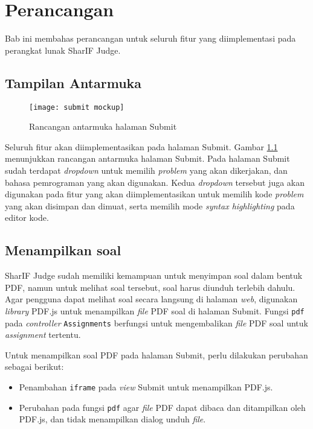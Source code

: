 \chapter{Perancangan}
\label{chap:perancangan}

Bab ini membahas perancangan untuk seluruh fitur yang diimplementasi pada  perangkat lunak SharIF Judge.

\section{Tampilan Antarmuka}
\label{sec:4:antarmuka}

\begin{figure}[H]
	\centering  
	\texttt{[image: submit mockup]}  
	\caption{Rancangan antarmuka halaman Submit} 
	\label{fig:4:antarmuka} 
\end{figure} 

Seluruh fitur akan diimplementasikan pada halaman Submit. Gambar \ref{fig:4:antarmuka} menunjukkan rancangan antarmuka halaman Submit. Pada halaman Submit sudah terdapat \textit{dropdown} untuk memilih \textit{problem} yang akan dikerjakan, dan bahasa pemrograman yang akan digunakan. Kedua \textit{dropdown} tersebut juga akan digunakan pada fitur yang akan diimplementasikan untuk memilih kode \textit{problem} yang akan disimpan dan dimuat, serta memilih mode \textit{syntax highlighting} pada editor kode.

\section{Menampilkan soal}
\label{sec:4:soal}

SharIF Judge sudah memiliki kemampuan untuk menyimpan soal dalam bentuk PDF, namun untuk melihat soal tersebut, soal harus diunduh terlebih dahulu. Agar pengguna dapat melihat soal secara langsung di halaman \textit{web}, digunakan \textit{library} PDF.js untuk menampilkan \textit{file} PDF soal di halaman Submit. Fungsi \verb|pdf| pada \textit{controller} \verb|Assignments| berfungsi untuk mengembalikan \textit{file} PDF soal untuk \textit{assignment} tertentu. 

Untuk menampilkan soal PDF pada halaman Submit, perlu dilakukan perubahan sebagai berikut:
\begin{itemize}
    \item Penambahan \verb|iframe| pada \textit{view} Submit untuk menampilkan PDF.js.
    \item Perubahan pada fungsi \verb|pdf| agar \textit{file} PDF dapat dibaca dan ditampilkan oleh PDF.js, dan tidak menampilkan dialog unduh \textit{file}.
\end{itemize}

